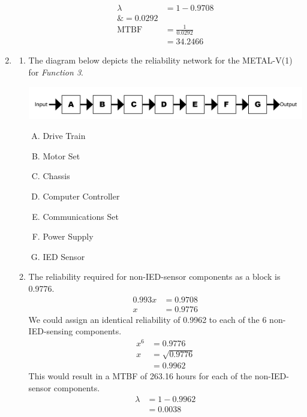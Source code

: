 \documentclass[letterpaper,10pt]{article}
\begin{document}
\begin{enumerate}
\begin{enumerate}
					\begin{align*}
						\lambda &= 1 - 0.9708 \\
						\&= 0.0292 \\
						\mbox{MTBF} &= \frac{1}{0.0292} \\
						&= 34.2466
					\end{align*}
			\end{enumerate}
		\item %
			\begin{enumerate}
				\item The diagram below depicts the reliability network for the METAL-V(1) for \emph{Function 3}.
					\begin{center}
						\includegraphics[scale=0.75]{ProjectAssignment1-4a.png}
					\end{center}
					\begin{enumerate}[A)]
						\item Drive Train
						\item Motor Set
						\item Chassis
						\item Computer Controller
						\item Communications Set
						\item Power Supply
						\item IED Sensor
					\end{enumerate}
				\item The reliability required for non-IED-sensor components as a block is 0.9776.
					\begin{align*}
						0.993x &= 0.9708 \\
						x &= 0.9776
					\end{align*}
					We could assign an identical reliability of 0.9962 to each of the 6 non-IED-sensing components.
					\begin{align*}
						x^{6} &= 0.9776 \\
						x &= \sqrt{0.9776} \\
						&= 0.9962
					\end{align*}
					This would result in a MTBF of 263.16 hours for each of the non-IED-sensor components.
					\begin{align*}
						\lambda &= 1 - 0.9962 \\
						&= 0.0038 \\

\end{align*}
\end{enumerate}
\end{enumerate}
\end{document}
